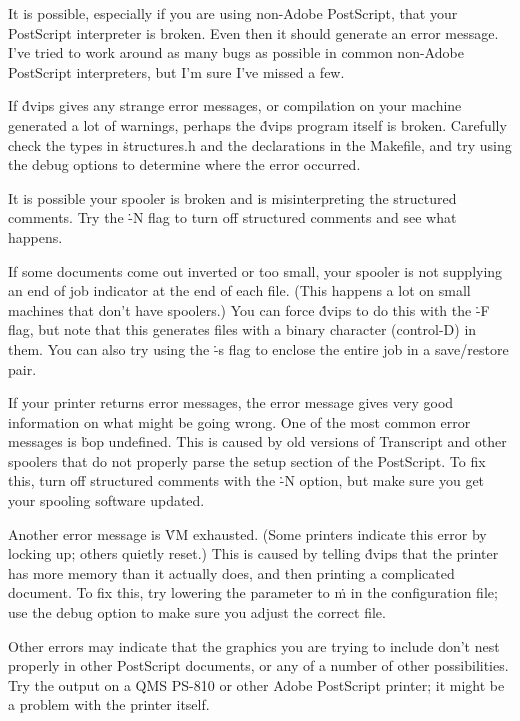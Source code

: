 It is possible, especially if you are using non-Adobe PostScript,
that your PostScript interpreter is broken.  Even then it should
generate an error message.  I've tried to work around as many bugs
as possible in common non-Adobe PostScript interpreters, but I'm
sure I've missed a few.

If \.{dvips} gives any strange error messages, or compilation on your
machine generated a lot of warnings, perhaps the \.{dvips} program
itself is broken.  Carefully check the types in \.{structures.h} and
the declarations in the \.{Makefile}, and try using the debug options
to determine where the error occurred.

It is possible your spooler is broken and is misinterpreting the
structured comments.  Try the \.{-N} flag to turn off
structured comments and see what happens.


If some documents come out inverted or too small, your spooler is not
supplying an end of job indicator at the end of each file.  (This happens
a lot on small machines that don't have spoolers.)  You can
force \.{dvips} to do this with the \.{-F} flag, but note that this
generates files with a binary character (control-D) in them.  You can
also try using the \.{-s} flag to enclose the entire job in a save/restore
pair.


If your printer returns error messages, the error message gives very
good information on what might be going wrong.  One of the most common
error messages is \.{bop undefined}.  This is caused by old versions
of Transcript and other spoolers that do not properly parse the
setup section of the PostScript.  To fix this, turn off structured
comments with the \.{-N} option, but make sure you get your spooling
software updated.

Another error message is \.{VM exhausted}.  (Some printers indicate
this error by locking up; others quietly reset.)  This is caused by telling
\.{dvips} that the printer has more memory than it actually does, and
then printing a complicated document.  To fix this, try lowering the
parameter to \.{m} in the configuration file; use the debug option
to make sure you adjust the correct file.

Other errors may indicate that the graphics you are trying to include
don't nest properly in other PostScript documents, or any of a number of
other possibilities.  Try the output on a QMS PS-810 or other Adobe
PostScript printer; it might be a problem with the printer itself.


